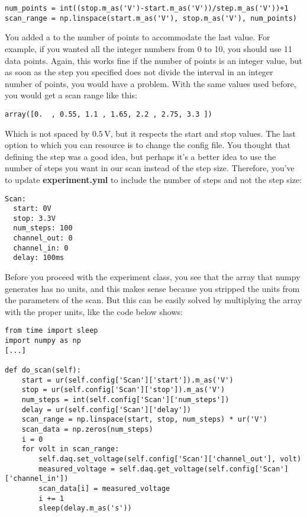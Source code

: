 \begin{verbatim}
num_points = int((stop.m_as('V')-start.m_as('V'))/step.m_as('V'))+1
scan_range = np.linspace(start.m_as('V'), stop.m_as('V'), num_points)
\end{verbatim}

You added a  to the number of points to accommodate the last value. For example, if you wanted all the integer numbers from 0 to 10, you should use 11 data points. Again, this works fine if the number of points is an integer value, but as soon as the step you specified does not divide the interval in an integer number of points, you would have a problem. With the same values used before, you would get a scan range like this:

\begin{verbatim}
array([0.  , 0.55, 1.1 , 1.65, 2.2 , 2.75, 3.3 ])
\end{verbatim}

Which is not spaced by $0.5\,\textrm{V}$, but it respects the start and stop values. The last option to which you can resource is to change the config file. You thought that defining the step was a good idea, but perhaps it's a better idea to use the number of steps you want in our scan instead of the step size. Therefore, you've to update \textbf{experiment.yml} to include the number of steps and not the step size:

\begin{verbatim}
Scan:
  start: 0V
  stop: 3.3V
  num_steps: 100
  channel_out: 0
  channel_in: 0
  delay: 100ms
\end{verbatim}

Before you proceed with the experiment class, you see that the array that numpy generates has no units, and this makes sense because you stripped the units from the parameters of the scan. But this can be easily solved by multiplying the array with the proper units, like the code below shows:

\begin{verbatim}
from time import sleep
import numpy as np
[...]

def do_scan(self):
    start = ur(self.config['Scan']['start']).m_as('V')
    stop = ur(self.config['Scan']['stop']).m_as('V')
    num_steps = int(self.config['Scan']['num_steps'])
    delay = ur(self.config['Scan']['delay'])
    scan_range = np.linspace(start, stop, num_steps) * ur('V')
    scan_data = np.zeros(num_steps)
    i = 0
    for volt in scan_range:
        self.daq.set_voltage(self.config['Scan']['channel_out'], volt)
        measured_voltage = self.daq.get_voltage(self.config['Scan']['channel_in'])
        scan_data[i] = measured_voltage
        i += 1
        sleep(delay.m_as('s'))
\end{verbatim}

